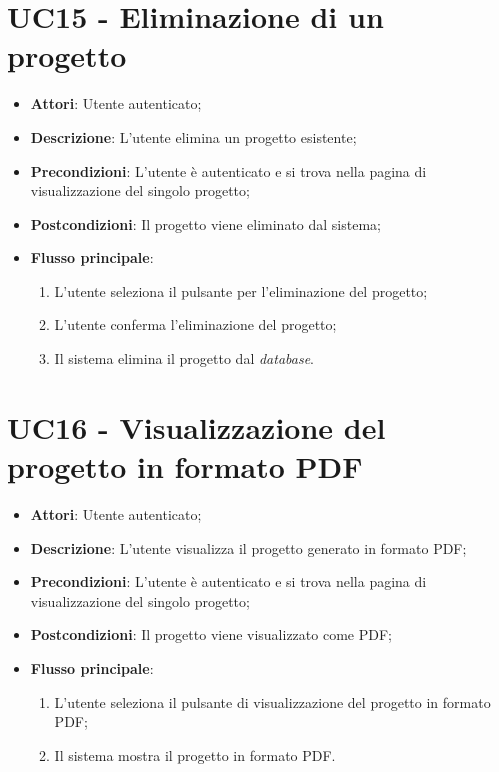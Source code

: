 \section*{UC15 - Eliminazione di un progetto}
\begin{itemize}
    \item \textbf{Attori}: Utente autenticato;
    \item \textbf{Descrizione}: L'utente elimina un progetto esistente;
    \item \textbf{Precondizioni}: L'utente è autenticato e si trova nella pagina di visualizzazione del singolo progetto;
    \item \textbf{Postcondizioni}: Il progetto viene eliminato dal sistema;
    \item \textbf{Flusso principale}:
    \begin{enumerate}
        \item L'utente seleziona il pulsante per l’eliminazione del progetto;
        \item L'utente conferma l'eliminazione del progetto;
        \item Il sistema elimina il progetto dal \textit{database}.
    \end{enumerate}
\end{itemize}

\vspace{0.5cm}  
\section*{UC16 - Visualizzazione del progetto in formato PDF}
\begin{itemize}
    \item \textbf{Attori}: Utente autenticato;
    \item \textbf{Descrizione}: L'utente visualizza il progetto generato in formato PDF;
    \item \textbf{Precondizioni}: L'utente è autenticato e si trova nella pagina di visualizzazione del singolo progetto;
    \item \textbf{Postcondizioni}: Il progetto viene visualizzato come PDF;
    \item \textbf{Flusso principale}:
    \begin{enumerate}
        \item L'utente seleziona il pulsante di visualizzazione del progetto in formato PDF;
        \item Il sistema mostra il progetto in formato PDF.
    \end{enumerate}
\end{itemize}

